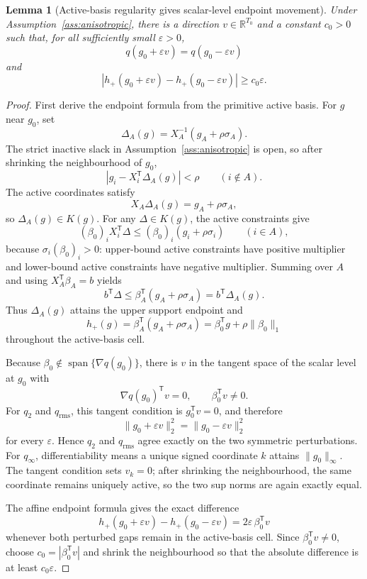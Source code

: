 \documentclass[11pt]{article}
\newcommand{\transpose}{\mathsf{T}}
\newcommand{\R}{\mathbb{R}}
\theoremstyle{definition}
\theoremstyle{plain}
\newtheorem{lemma}{Lemma}
\theoremstyle{remark}
\begin{document}
\begin{lemma}[Active-basis regularity gives scalar-level endpoint movement]\label{lem:primitive-anisotropy}
Under Assumption~\ref{ass:anisotropic}, there is a direction \(v\in\R^{T_0}\)
and a constant \(c_0>0\) such that, for all sufficiently small
\(\varepsilon>0\),
\[
q(g_0+\varepsilon v)=q(g_0-\varepsilon v)
\]
and
\[
\left|h_+(g_0+\varepsilon v)-h_+(g_0-\varepsilon v)\right|
\ge c_0\varepsilon .
\]
\end{lemma}

\begin{proof}
First derive the endpoint formula from the primitive active basis.  For \(g\)
near \(g_0\), set
\[
\Delta_A(g)=X_A^{-1}(g_A+\rho\sigma_A).
\]
The strict inactive slack in Assumption~\ref{ass:anisotropic} is open, so after
shrinking the neighbourhood of \(g_0\),
\[
|g_i-X_i^\transpose\Delta_A(g)|<\rho\qquad(i\notin A).
\]
The active coordinates satisfy
\[
X_A\Delta_A(g)=g_A+\rho\sigma_A,
\]
so \(\Delta_A(g)\in K(g)\).  For any \(\Delta\in K(g)\), the active constraints
give
\[
(\beta_0)_i X_i^\transpose\Delta
\le
(\beta_0)_i(g_i+\rho\sigma_i)\qquad(i\in A),
\]
because \(\sigma_i(\beta_0)_i>0\): upper-bound active constraints have positive
multiplier and lower-bound active constraints have negative multiplier.
Summing over \(A\) and using \(X_A^\transpose\beta_A=b\) yields
\[
b^\transpose\Delta
\le
\beta_A^\transpose(g_A+\rho\sigma_A)
=b^\transpose\Delta_A(g).
\]
Thus \(\Delta_A(g)\) attains the upper support endpoint and
\[
h_+(g)=\beta_A^\transpose(g_A+\rho\sigma_A)
       =\beta_0^\transpose g+\rho\|\beta_0\|_1
\]
throughout the active-basis cell.

Because \(\beta_0\notin\operatorname{span}\{\nabla q(g_0)\}\), there is
\(v\) in the tangent space of the scalar level at \(g_0\) with
\[
\nabla q(g_0)^\transpose v=0,\qquad \beta_0^\transpose v\ne0.
\]
For \(q_2\) and \(q_{\mathrm{rms}}\), this tangent condition is
\(g_0^\transpose v=0\), and therefore
\[
\|g_0+\varepsilon v\|_2^2=\|g_0-\varepsilon v\|_2^2
\]
for every \(\varepsilon\).  Hence \(q_2\) and \(q_{\mathrm{rms}}\) agree exactly
on the two symmetric perturbations.  For \(q_\infty\), differentiability means a
unique signed coordinate \(k\) attains \(\|g_0\|_\infty\).  The tangent
condition sets \(v_k=0\); after shrinking the neighbourhood, the same coordinate
remains uniquely active, so the two sup norms are again exactly equal.

The affine endpoint formula gives the exact difference
\[
h_+(g_0+\varepsilon v)-h_+(g_0-\varepsilon v)
=2\varepsilon\,\beta_0^\transpose v
\]
whenever both perturbed gaps remain in the active-basis cell.  Since
\(\beta_0^\transpose v\ne0\), choose
\(c_0=|\beta_0^\transpose v|\) and shrink the neighbourhood so that the
absolute difference is at least \(c_0\varepsilon\).
\end{proof}
\end{document}
